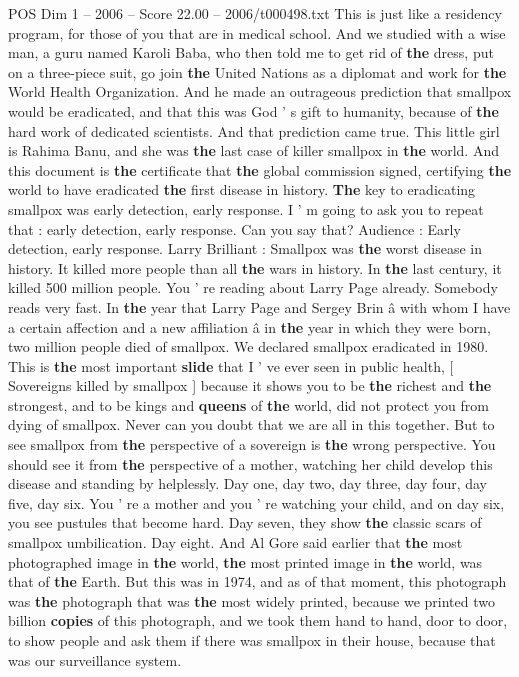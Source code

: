 \begin{textsample}{POS Dim 1 – 2006 – Score 22.00 – 2006/t000498.txt}
This is just like a residency program, for those of you that are in medical school.
And we studied with a wise man, a guru named Karoli Baba, who then told me to get rid of \textbf{the} dress, put on a three-piece suit, go join \textbf{the} United Nations as a diplomat and work for \textbf{the} World Health Organization.
And he made an outrageous prediction that smallpox would be eradicated, and that this was God ' s gift to humanity, because of \textbf{the} hard work of dedicated scientists.
And that prediction came true.
This little girl is Rahima Banu, and she was \textbf{the} last case of killer smallpox in \textbf{the} world.
And this document is \textbf{the} certificate that \textbf{the} global commission signed, certifying \textbf{the} world to have eradicated \textbf{the} first disease in history. \textbf{The} key to eradicating smallpox was early detection, early response.
I ' m going to ask you to repeat that : early detection, early response.
Can you say that?
Audience : Early detection, early response.
Larry Brilliant : Smallpox was \textbf{the} worst disease in history.
It killed more people than all \textbf{the} wars in history.
In \textbf{the} last century, it killed 500 million people.
You ' re reading about Larry Page already.
Somebody reads very fast.
In \textbf{the} year that Larry Page and Sergey Brin â with whom I have a certain affection and a new affiliation â in \textbf{the} year in which they were born, two million people died of smallpox.
We declared smallpox eradicated in 1980.
This is \textbf{the} most important \textbf{slide} that I ' ve ever seen in public health, [ Sovereigns killed by smallpox ] because it shows you to be \textbf{the} richest and \textbf{the} strongest, and to be kings and \textbf{queens} of \textbf{the} world, did not protect you from dying of smallpox.
Never can you doubt that we are all in this together.
But to see smallpox from \textbf{the} perspective of a sovereign is \textbf{the} wrong perspective.
You should see it from \textbf{the} perspective of a mother, watching her child develop this disease and standing by helplessly.
Day one, day two, day three, day four, day five, day six.
You ' re a mother and you ' re watching your child, and on day six, you see pustules that become hard.
Day seven, they show \textbf{the} classic scars of smallpox umbilication.
Day eight.
And Al Gore said earlier that \textbf{the} most photographed image in \textbf{the} world, \textbf{the} most printed image in \textbf{the} world, was that of \textbf{the} Earth.
But this was in 1974, and as of that moment, this photograph was \textbf{the} photograph that was \textbf{the} most widely printed, because we printed two billion \textbf{copies} of this photograph, and we took them hand to hand, door to door, to show people and ask them if there was smallpox in their house, because that was our surveillance system.

\end{textsample}
